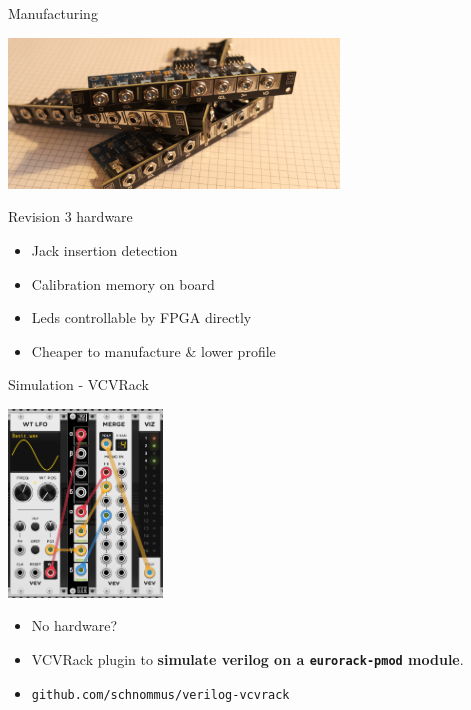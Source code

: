 \documentclass[aspectratio=169]{beamer}
\begin{document}
\begin{frame}{Manufacturing}
    \begin{center}
        \includegraphics[height=4cm]{img/mfg_stack.png}
    \end{center}
    \begin{block}{Revision 3 hardware}
        \begin{itemize}
            \item Jack insertion detection
            \item Calibration memory on board
            \item Leds controllable by FPGA directly
            \item Cheaper to manufacture \& lower profile
        \end{itemize}
    \end{block}
\end{frame}

\begin{frame}{Simulation - VCVRack}
    \begin{center}
        \includegraphics[height=5cm]{img/vcvrack.png}
    \end{center}
    \begin{itemize}
        \item No hardware?
        \item VCVRack plugin to \textbf{simulate verilog on a \texttt{eurorack-pmod} module}.
        \item \texttt{github.com/schnommus/verilog-vcvrack}
    \end{itemize}
\end{frame}
\end{document}
